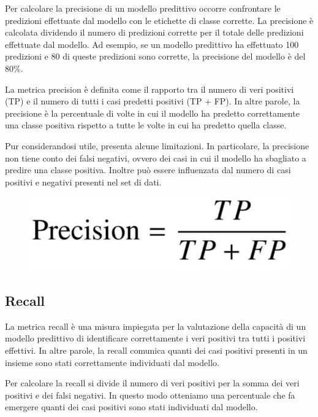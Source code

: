 Per calcolare la precisione di un modello predittivo occorre confrontare le predizioni effettuate dal modello con le etichette di classe corrette. La precisione è calcolata dividendo il numero di predizioni corrette per il totale delle predizioni effettuate dal modello. Ad esempio, se un modello predittivo ha effettuato 100 predizioni e 80 di queste predizioni sono corrette, la precisione del modello è del 80\%.

La metrica precision è definita come il rapporto tra il numero di veri positivi (TP) e il numero di tutti i casi predetti positivi (TP + FP). In altre parole, la precisione è la percentuale di volte in cui il modello ha predetto correttamente una classe positiva rispetto a tutte le volte in cui ha predetto quella classe.

Pur considerandosi utile, presenta alcune limitazioni. In particolare, la precisione non tiene conto dei falsi negativi, ovvero dei casi in cui il modello ha sbagliato a predire una classe positiva. Inoltre può essere influenzata dal numero di casi positivi e negativi presenti nel set di dati.

\begin{figure}
    \begin{center}    
        \includegraphics[width=0.9\linewidth]{images/image48.jpeg}
    \end{center}
\end{figure}

\subsection{Recall}
La metrica recall è una misura impiegata per la valutazione della capacità di un modello predittivo di identificare correttamente i veri positivi tra tutti i positivi effettivi. In altre parole, la recall comunica quanti dei casi positivi presenti in un insieme sono stati correttamente individuati dal modello.

Per calcolare la recall si divide il numero di veri positivi per la somma dei veri positivi e dei falsi negativi. In questo modo otteniamo una percentuale che fa emergere quanti dei casi positivi sono stati individuati dal modello.

